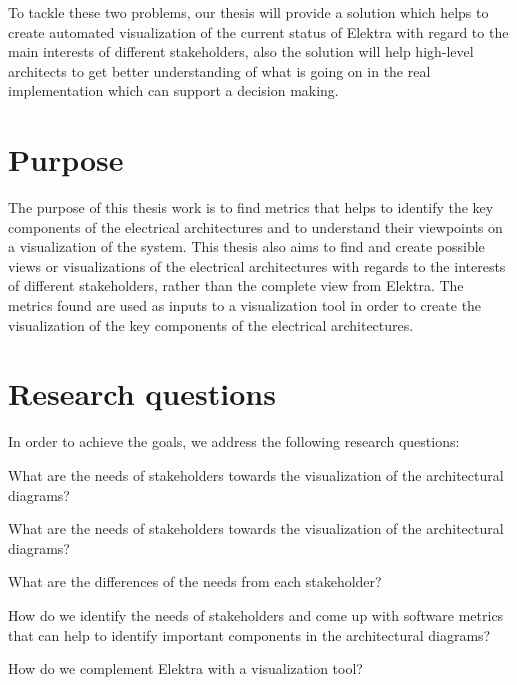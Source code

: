 To tackle these two problems, our thesis will provide a solution which helps to create automated visualization of the current status of Elektra with regard to the main interests of different stakeholders, also the solution will help high-level architects to get better understanding of what is going on in the real implementation which can support a decision making.


\section{Purpose} \label{Purpose_ref}
The purpose of this thesis work is to find metrics that helps to identify the key components of the electrical architectures and to understand their viewpoints on a visualization of the system. This thesis also aims to find and create possible views or visualizations of the electrical architectures with regards to the interests of different stakeholders, rather than the complete view from Elektra. The metrics found are used as inputs to a visualization tool in order to create the visualization of the key components of the electrical architectures.

\section{Research questions} \label{RQ_ref}
In order to achieve the goals, we address the following research questions:

\begin{que} \label{que:1}
What are the needs of stakeholders towards the visualization of the architectural diagrams?
\end{que}

\begin{que} \label{que:2}
What are the needs of stakeholders towards the visualization of the architectural diagrams?
\end{que}

\begin{que} \label{que:3}
What are the differences of the needs from each stakeholder?
\end{que}

\begin{que} \label{que:4}
How do we identify the needs of stakeholders and come up with software metrics that can help to identify important components in the architectural diagrams?
\end{que}

\begin{que}\label{que:5}
How do we complement Elektra with a visualization tool?
\end{que}

